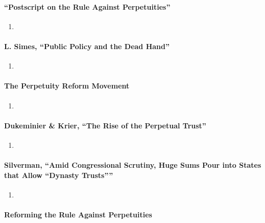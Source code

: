 \paragraph{``Postscript on the Rule Against Perpetuities''}

\begin{enumerate}
    \item %
\end{enumerate}

\paragraph{L. Simes, ``Public Policy and the Dead Hand''}

\begin{enumerate}
    \item %
\end{enumerate}

\paragraph{The Perpetuity Reform Movement}

\begin{enumerate}
    \item %
\end{enumerate}

\paragraph{Dukeminier \& Krier, ``The Rise of the Perpetual Trust''}

\begin{enumerate}
    \item %
\end{enumerate}

\paragraph{Silverman, ``Amid Congressional Scrutiny, Huge Sums Pour into 
States that Allow \enquote{Dynasty Trusts}''}

\begin{enumerate}
    \item %
\end{enumerate}

\paragraph{Reforming the Rule Against Perpetuities}

